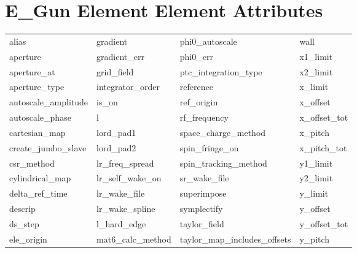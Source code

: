  \vfill
 
 \section{E_Gun Element Element Attributes}
 \label{s:list.e.gun}
 
 \begin{tabular}{llll} \toprule
alias                       & gradient                    & phi0_autoscale              & wall                        \\
aperture                    & gradient_err                & phi0_err                    & x1_limit                    \\
aperture_at                 & grid_field                  & ptc_integration_type        & x2_limit                    \\
aperture_type               & integrator_order            & reference                   & x_limit                     \\
autoscale_amplitude         & is_on                       & ref_origin                  & x_offset                    \\
autoscale_phase             & l                           & rf_frequency                & x_offset_tot                \\
cartesian_map               & lord_pad1                   & space_charge_method         & x_pitch                     \\
create_jumbo_slave          & lord_pad2                   & spin_fringe_on              & x_pitch_tot                 \\
csr_method                  & lr_freq_spread              & spin_tracking_method        & y1_limit                    \\
cylindrical_map             & lr_self_wake_on             & sr_wake_file                & y2_limit                    \\
delta_ref_time              & lr_wake_file                & superimpose                 & y_limit                     \\
descrip                     & lr_wake_spline              & symplectify                 & y_offset                    \\
ds_step                     & l_hard_edge                 & taylor_field                & y_offset_tot                \\
ele_origin                  & mat6_calc_method            & taylor_map_includes_offsets & y_pitch                     \\

\end{tabular}
